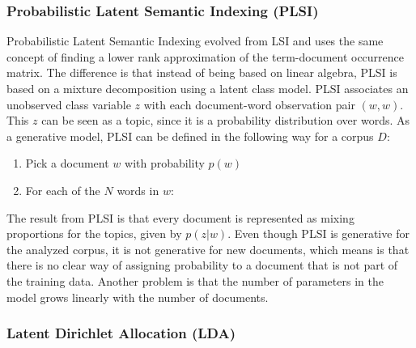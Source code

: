 \documentclass[12pt]{report}
\begin{document}
\subsubsection{Probabilistic Latent Semantic Indexing (PLSI)}


Probabilistic Latent Semantic Indexing evolved from LSI and uses the same concept of finding a lower rank approximation of the term-document occurrence matrix. 
The difference is that instead of being based on linear algebra, PLSI is based on a mixture decomposition using a latent class model. 
PLSI associates an unobserved class variable $z$ with each document-word observation pair $(w, w)$. 
This $z$ can be seen as a topic, since it is a probability distribution over words. 
As a generative model, PLSI can be defined in the following way for a corpus $D$:

\begin{enumerate}
\item Pick a document $w$ with probability $p(w)$
\item For each of the $N$ words in $w$:
\end{enumerate}


The result from PLSI is that every document is represented as mixing proportions for the topics, given by $p(z|w)$. 
Even though PLSI is generative for the analyzed corpus, it is not generative for new documents, which means is that there is no clear way of assigning probability to a document that is not part of the training data. 
Another problem is that the number of parameters in the model grows linearly with the number of documents.


\subsubsection{Latent Dirichlet Allocation (LDA)}
\end{document}
